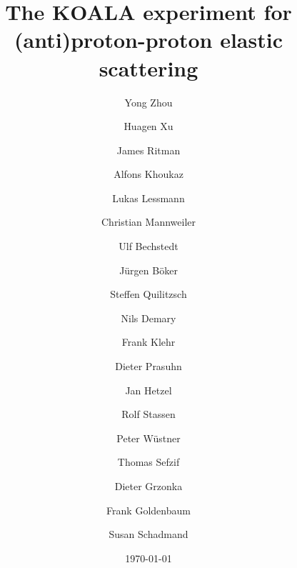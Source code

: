 \documentclass[number,5p]{elsarticle}
\begin{document}
\begin{frontmatter}	
  \title{The KOALA experiment for (anti)proton-proton elastic scattering}
  \date{\today}

  \author[ikp]{Yong Zhou}
  \author[ikp]{Huagen Xu}
  \author[ikp,bochum]{James Ritman}

  \author[muenster]{Alfons Khoukaz}
  \author[muenster]{Lukas Lessmann}
  \author[muenster]{Christian Mannweiler}

  \author[ikp]{Ulf Bechstedt}
  \author[ikp]{Jürgen Böker}
  \author[ikp]{Steffen Quilitzsch}
  \author[ikp]{Nils Demary}
  \author[ikp]{Frank Klehr}

  \author[ikp]{Dieter Prasuhn}
  \author[ikp]{Jan Hetzel}
  \author[ikp]{Rolf Stassen}

  \author[zea]{Peter Wüstner}
  \author[ikp]{Thomas Sefzif}

  \author[ikp]{Dieter Grzonka}
  \author[ikp]{Frank Goldenbaum}
  \author[ikp]{Susan Schadmand}


  \address[ikp]{Institut für Kernphysik, Forschungszentrum Jülich, Jülich, 52425, Germany}
  \address[muenster]{Institut für Kernphysik, Universität Münster, Münster, 48149, Germany}
  \address[zea]{Zentralinstitut für Engineering, Elektronik und Analytik, Forschungszentrum Jülich, Jülich, 52425, Germany}
  \address[bochum]{Ruhr-Universität Bochum, Bochum, 44780, Germany}


  \begin{abstract}



\end{abstract}
\end{frontmatter}
\end{document}
